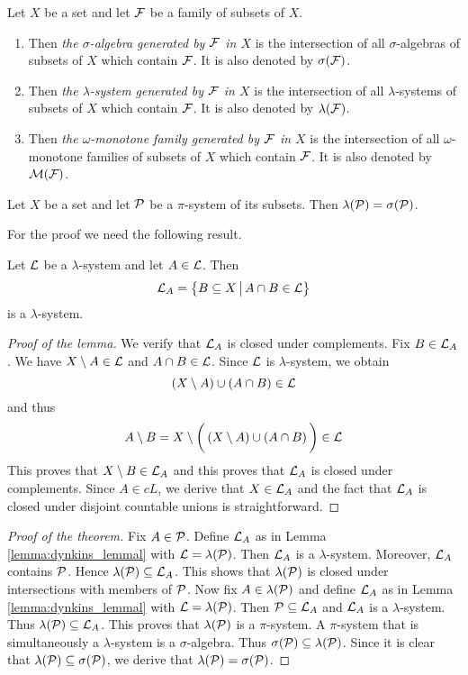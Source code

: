 \begin{definition}
Let $X$ be a set and let ${\mathcal F}$ be a family of subsets of $X$. 
\begin{enumerate}[label=\textbf{(\arabic*)}, leftmargin=*]
\item Then \textit{the $\sigma$-algebra generated by ${\mathcal F}$ in $X$} is the intersection of all $\sigma$-algebras of subsets of $X$ which contain ${\mathcal F}$. It is also denoted by $\sigma({\mathcal F})$.
\item Then \textit{the $\lambda$-system generated by ${\mathcal F}$ in $X$} is the intersection of all $\lambda$-systems of subsets of $X$ which contain ${\mathcal F}$. It is also denoted by $\lambda({\mathcal F})$.
\item Then \textit{the $\omega$-monotone family generated by ${\mathcal F}$ in $X$} is the intersection of all $\omega$-monotone families of subsets of $X$ which contain ${\mathcal F}$. It is also denoted by ${\mathcal M}({\mathcal F})$.
\end{enumerate}
\end{definition}

\begin{theorem}\label{theorem:dynkins_lemma}
Let $X$ be a set and let ${\mathcal P}$ be a $\pi$-system of its subsets. Then $\lambda({\mathcal P})=\sigma({\mathcal P})$.
\end{theorem}
\noindent
For the proof we need the following result.

\begin{lemma}\label{lemma:dynkins_lemmal}
Let ${\mathcal L}$ be a $\lambda$-system and let $A \in {\mathcal L}$. Then 
$${\mathcal L}_A=\big\{B\subseteq X\,\big|\,A\cap B\in {\mathcal L} \big\}$$
is a $\lambda$-system.
\end{lemma}
\begin{proof}[Proof of the lemma]
We verify that ${\mathcal L}_A$ is closed under complements. Fix $B \in {\mathcal L}_A$. We have $X\setminus A \in {\mathcal L}$ and $A\cap B\in {\mathcal L}$. Since ${\mathcal L}$ is $\lambda$-system, we obtain
$$\left(X\setminus A\right)\cup \left(A\cap B\right)\in {\mathcal L}$$
and thus 
$$A\setminus B = X\setminus \bigg(\left(X\setminus A\right)\cup \left(A\cap B\right)\bigg) \in {\mathcal L}$$
This proves that $X\setminus B \in {\mathcal L}_A$ and this proves that ${\mathcal L}_A$ is closed under complements. Since $A\in cL$, we derive that $X\in {\mathcal L}_A$ and the fact that ${\mathcal L}_A$ is closed under disjoint countable unions is straightforward.
\end{proof}

\begin{proof}[Proof of the theorem]
Fix $A\in {\mathcal P}$. Define ${\mathcal L}_A$ as in Lemma \ref{lemma:dynkins_lemmal} with ${\mathcal L} = \lambda({\mathcal P})$. Then ${\mathcal L}_A$ is a $\lambda$-system. Moreover, ${\mathcal L}_A$ contains ${\mathcal P}$. Hence $\lambda({\mathcal P})\subseteq {\mathcal L}_A$. This shows that $\lambda({\mathcal P})$ is closed under intersections with members of ${\mathcal P}$. Now fix $A\in \lambda({\mathcal P})$ and define ${\mathcal L}_A$ as in Lemma \ref{lemma:dynkins_lemmal} with ${\mathcal L} = \lambda({\mathcal P})$. Then ${\mathcal P} \subseteq {\mathcal L}_A$ and ${\mathcal L}_A$ is a $\lambda$-system. Thus $\lambda({\mathcal P})\subseteq {\mathcal L}_A$. This proves that $\lambda({\mathcal P})$ is a $\pi$-system. A $\pi$-system that is simultaneously a $\lambda$-system is a $\sigma$-algebra. Thus $\sigma({\mathcal P})\subseteq \lambda({\mathcal P})$. Since it is clear that $\lambda({\mathcal P}) \subseteq \sigma({\mathcal P})$, we derive that $\lambda({\mathcal P})=\sigma({\mathcal P})$.
\end{proof}

